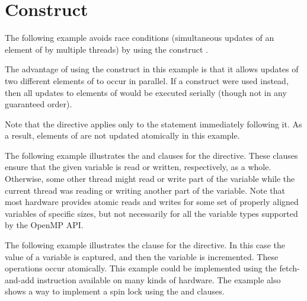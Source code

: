 \pagebreak
\section{ Construct}
\label{sec:atomic}

The following example avoids race conditions (simultaneous updates of an element 
of  by multiple threads) by using the  construct .

The advantage of using the  construct in this example is that it 
allows updates of two different elements of  to occur in parallel. If 
a  construct were used instead, then all updates to elements of 
 would be executed serially (though not in any guaranteed order).

Note that the  directive applies only to the statement immediately 
following it. As a result, elements of  are not updated atomically in 
this example.



The following example illustrates the  and   clauses 
for the  directive. These clauses ensure that the given variable 
is read or written, respectively, as a whole. Otherwise, some other thread might 
read or write part of the variable while the current thread was reading or writing 
another part of the variable. Note that most hardware provides atomic reads and 
writes for some set of properly aligned variables of specific sizes, but not necessarily 
for all the variable types supported by the OpenMP API.



The following example illustrates the  clause for the  
directive. In this case the value of a variable is captured, and then the variable 
is incremented. These operations occur atomically. This example could 
be implemented using the fetch-and-add instruction available on many kinds of hardware. 
The example also shows a way to implement a spin lock using the  
 and  clauses.




